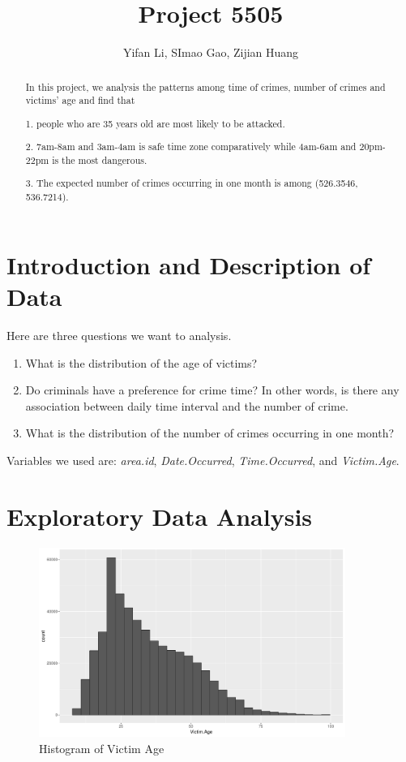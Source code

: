 \documentclass[UTF8]{article}
\title{Project 5505}
\author{Yifan Li, SImao Gao, Zijian Huang}
\begin{document}
\maketitle

\begin{abstract}
    
    In this project, we analysis the patterns among time of crimes, number of crimes and victims' age and find that 
    
    1. people who are 35 years old are most likely to be attacked. 
    
    2. 7am-8am and 3am-4am is safe time zone comparatively while 4am-6am and 20pm-22pm is the most dangerous. 

    3. The expected number of crimes occurring in one month is among (526.3546, 536.7214).



\end{abstract}


\section{Introduction and Description of Data}

Here are three questions we want to analysis.

\begin{enumerate}
    \item What is the distribution of the age of victims?
    \item Do criminals have a preference for crime time? In other words, is there any association between daily time interval and the number of crime.
    \item What is the distribution of the number of crimes occurring in one month?
\end{enumerate}

Variables we used are: \textit{area.id}, \textit{Date.Occurred}, \textit{Time.Occurred}, and \textit{Victim.Age}.

\section{Exploratory Data Analysis}

\begin{figure}[htb]
    \includegraphics[width=10cm,height=6.18cm]{../image/1.pdf}
    \caption{Histogram of Victim Age}\label{fig:Victim_Age} 
\end{figure}
\end{document}
